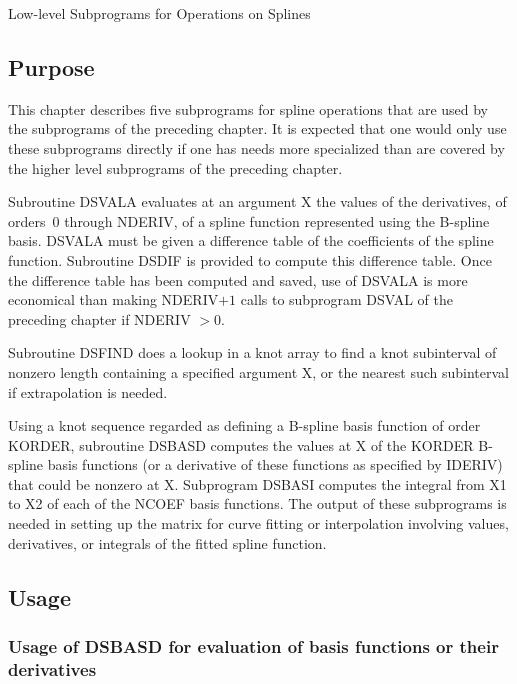 \documentclass[twoside]{MATH77}
\begin{document}
 Low-level Subprograms for Operations on Splines


\subsection{Purpose}

This chapter describes five subprograms for spline operations that are used
by the subprograms of the preceding chapter. It is expected that one would
only use these subprograms directly if one has needs more specialized than
are covered by the higher level subprograms of the preceding chapter.

Subroutine DSVALA evaluates at an argument X the values of the derivatives,
of orders~0 through NDERIV, of a spline function represented using the
B-spline basis. DSVALA must be given a difference table of the coefficients
of the spline function. Subroutine DSDIF is provided to compute this
difference table. Once the difference table has been computed and saved, use
of DSVALA is more economical than making NDERIV$+1$ calls to subprogram
DSVAL of the preceding chapter if NDERIV $> 0.$

Subroutine DSFIND does a lookup in a knot array to find a knot subinterval
of nonzero length containing a specified argument X, or the nearest such
subinterval if extrapolation is needed.

Using a knot sequence regarded as defining a B-spline basis function of
order KORDER, subroutine DSBASD computes the values at X of the KORDER
B-spline basis functions (or a derivative of these functions as specified by
IDERIV) that could be nonzero at X. Subprogram DSBASI computes the integral
from X1 to X2 of each of the NCOEF basis functions. The output of these
subprograms is needed in setting up the matrix for curve fitting or
interpolation involving values, derivatives, or integrals of the fitted
spline function.

\subsection{Usage}

\subsubsection{Usage of DSBASD for evaluation of basis functions or their
derivatives}
\end{document}
